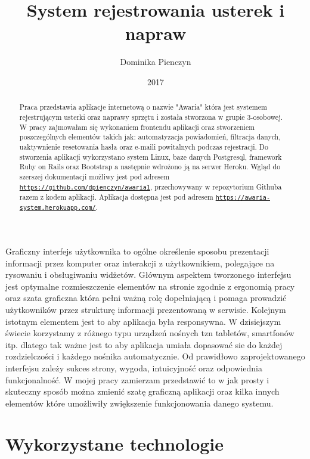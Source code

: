 \documentclass[openright]{xmgr}
\author   {Dominika Pienczyn}
\title    {System rejestrowania usterek i napraw}
\date     {2017}
\begin{document}
	
	\begin{abstract}
		Praca przedstawia aplikacje internetową o nazwie "Awaria" która jest systemem rejestrującym usterki oraz naprawy sprzętu i została stworzona w grupie 3-osobowej. W pracy zajmowałam się wykonaniem frontendu aplikacji oraz stworzeniem poszczególnych elementów takich jak: automatyzacja powiadomień, filtracja danych, uaktywnienie resetowania hasła oraz e-maili powitalnych podczas rejestracji. Do stworzenia aplikacji wykorzystano system Linux, baze danych Postgresql, framework Ruby on Rails oraz Bootstrap a następnie wdrożono ją na serwer Heroku. Wgląd do szerszej dokumentacji możliwy jest pod adresem \texttt{\url{https://github.com/dpienczyn/awaria1}}, przechowywany w repozytorium Githuba razem z kodem aplikacji. Aplikacja dostępna jest pod adresem \texttt{\url{https://awaria-system.herokuapp.com/}}.
	\end{abstract}
	
	
	\maketitle
	
	\introduction
	
	Graficzny interfejs użytkownika to ogólne określenie sposobu prezentacji informacji przez komputer oraz interakcji z użytkownikiem, polegające na rysowaniu i obsługiwaniu widżetów. Głównym aspektem tworzonego interfejsu jest optymalne rozmieszczenie elementów na stronie zgodnie z ergonomią pracy oraz szata graficzna która pełni ważną rolę dopełniającą i pomaga prowadzić użytkowników przez strukturę informacji prezentowaną w serwisie. Kolejnym istotnym elementem jest to aby aplikacja była responsywna. W dzisiejszym świecie korzystamy z różnego typu urządzeń nośnych tzn tabletów, smartfonów itp. dlatego tak ważne jest to aby aplikacja umiała dopasować sie do każdej rozdzielczości i każdego nośnika automatycznie. Od prawidłowo zaprojektowanego interfejsu zależy sukces strony, wygoda, intuicyjność oraz odpowiednia funkcjonalność. W mojej pracy zamierzam przedstawić to w jak prosty i skuteczny sposób można zmienić szatę graficzną aplikacji oraz kilka innych elementów które umożliwiły zwiększenie funkcjonowania danego systemu.
	
	\chapter{Wykorzystane technologie}
	
\end{document}
